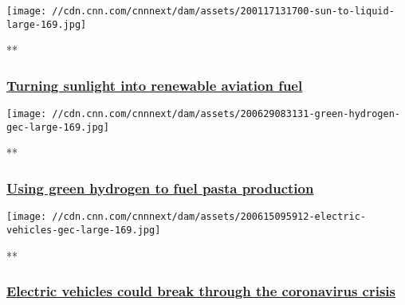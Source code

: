 \href{/videos/business/2020/01/17/solar-kerosene-energy-gec.cnn-business/video/playlists/business-global-energy-challenge/}{}

\texttt{[image: //cdn.cnn.com/cnnnext/dam/assets/200117131700-sun-to-liquid-large-169.jpg]}

**

\hypertarget{turning-sunlight-into-renewable-aviation-fuel}{%
\subsubsection{\texorpdfstring{\href{/videos/business/2020/01/17/solar-kerosene-energy-gec.cnn-business/video/playlists/business-global-energy-challenge/}{Turning
sunlight into renewable aviation
fuel}}{Turning sunlight into renewable aviation fuel}}\label{turning-sunlight-into-renewable-aviation-fuel}}

\href{/videos/business/2020/06/29/green-hydrogen-energy-gec.cnn-business/video/playlists/business-global-energy-challenge/}{}

\texttt{[image: //cdn.cnn.com/cnnnext/dam/assets/200629083131-green-hydrogen-gec-large-169.jpg]}

**

\hypertarget{using-green-hydrogen-to-fuel-pasta-production}{%
\subsubsection{\texorpdfstring{\href{/videos/business/2020/06/29/green-hydrogen-energy-gec.cnn-business/video/playlists/business-global-energy-challenge/}{Using
green hydrogen to fuel pasta
production}}{Using green hydrogen to fuel pasta production}}\label{using-green-hydrogen-to-fuel-pasta-production}}

\href{/videos/business/2020/06/15/electric-vehicles-auto-industry-coronavirus-gec.cnn-business/video/playlists/business-global-energy-challenge/}{}

\texttt{[image: //cdn.cnn.com/cnnnext/dam/assets/200615095912-electric-vehicles-gec-large-169.jpg]}

**

\hypertarget{electric-vehicles-could-break-through-the-coronavirus-crisis}{%
\subsubsection{\texorpdfstring{\href{/videos/business/2020/06/15/electric-vehicles-auto-industry-coronavirus-gec.cnn-business/video/playlists/business-global-energy-challenge/}{Electric
vehicles could break through the coronavirus
crisis}}{Electric vehicles could break through the coronavirus crisis}}\label{electric-vehicles-could-break-through-the-coronavirus-crisis}}


